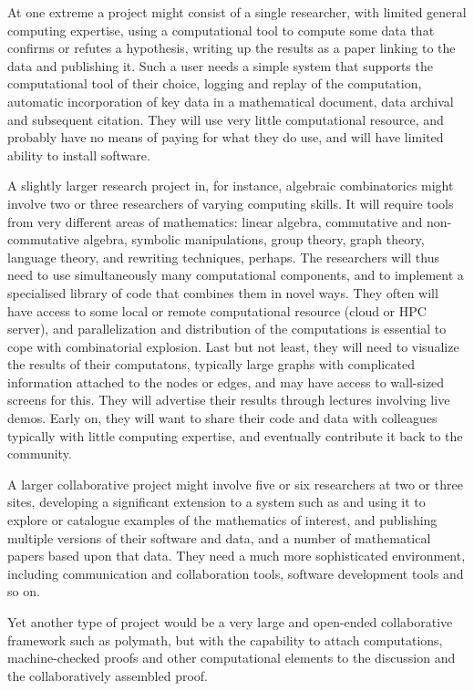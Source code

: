 \begin{compactitem}
\item At one extreme a project might consist of a single researcher, with limited
  general computing expertise, using a computational tool to compute some data
  that confirms or refutes a hypothesis, writing up the results as a paper
  linking to the data and publishing it. Such a user needs a simple system
  that supports the computational tool of their choice, logging and replay of
  the computation, automatic incorporation of key data in a mathematical
  document, data archival and subsequent citation. They will use very little
  computational resource, and probably have no means of paying for what they
  do use, and will have limited ability to install software.

\item A slightly larger research project in, for instance, algebraic
  combinatorics might involve
  two or three researchers of varying computing skills. It will
  require tools from very different areas of mathematics:
  linear algebra, commutative and non-commutative algebra, symbolic
  manipulations, group theory, graph theory, language theory, and
  rewriting techniques, perhaps. The researchers will thus need to use simultaneously many
  computational components, and to implement a specialised library of code
  that combines them in novel ways. They often will have access to
  some local or remote computational resource (cloud or HPC server),
  and parallelization and distribution of the computations is
  essential to cope with combinatorial explosion. Last but not
  least, they will need to visualize the results of their computatons,
 typically large graphs
  with complicated information attached to the nodes or edges, and may have
  access to wall-sized screens for this. They will advertise their
  results through lectures involving live demos. Early on, they will
  want to share their code and data with colleagues typically with
  little computing expertise, and eventually contribute it back to the
  community.

\item A larger collaborative project might involve five or six researchers at two
  or three sites, developing a significant extension to a system such as \Sage
  and using it to explore or catalogue examples of the mathematics of
  interest, and publishing multiple versions of their software and data, and a
  number of mathematical papers based upon that data. They need a much more
  sophisticated environment, including communication and collaboration tools,
  software development tools and so on.

\item Yet another type of project would be a very large and open-ended
  collaborative framework such as polymath, but with the capability to attach
  computations, machine-checked proofs and other computational elements to the
  discussion and the collaboratively assembled proof.
\end{compactitem}

